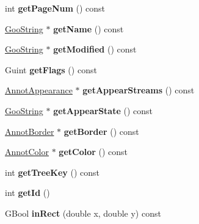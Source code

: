 \begin{DoxyCompactItemize}
int {\bfseries get\+Page\+Num} () const
\item 
\mbox{\label{class_annot_a89fdc8236d44a68b467b9431bafcb4bb}} 
\hyperlink{class_goo_string}{Goo\+String} $\ast$ {\bfseries get\+Name} () const
\item 
\mbox{\label{class_annot_a2b9292f4fad358e033d1d0dee8465e0d}} 
\hyperlink{class_goo_string}{Goo\+String} $\ast$ {\bfseries get\+Modified} () const
\item 
\mbox{\label{class_annot_aad03bcbab8d5c9a3e997e8413a6eacef}} 
Guint {\bfseries get\+Flags} () const
\item 
\mbox{\label{class_annot_aaf02aad6cb00d17c627e75698a5b336f}} 
\hyperlink{class_annot_appearance}{Annot\+Appearance} $\ast$ {\bfseries get\+Appear\+Streams} () const
\item 
\mbox{\label{class_annot_adfa10b0bff07a32e76d1be01dead6576}} 
\hyperlink{class_goo_string}{Goo\+String} $\ast$ {\bfseries get\+Appear\+State} () const
\item 
\mbox{\label{class_annot_a522e0a878399c8da8f5aef12633b4608}} 
\hyperlink{class_annot_border}{Annot\+Border} $\ast$ {\bfseries get\+Border} () const
\item 
\mbox{\label{class_annot_a9f6adad85617929e5789c8e4b69c8e1e}} 
\hyperlink{class_annot_color}{Annot\+Color} $\ast$ {\bfseries get\+Color} () const
\item 
\mbox{\label{class_annot_a11e6b89c1544dffa418fe9a6128900c9}} 
int {\bfseries get\+Tree\+Key} () const
\item 
\mbox{\label{class_annot_a6f299757ece14abbae898e0771d1c494}} 
int {\bfseries get\+Id} ()
\item 
\mbox{\label{class_annot_a0d999d2bcd3b57803defa92d5c2890af}} 
G\+Bool {\bfseries in\+Rect} (double x, double y) const
\end{DoxyCompactItemize}
